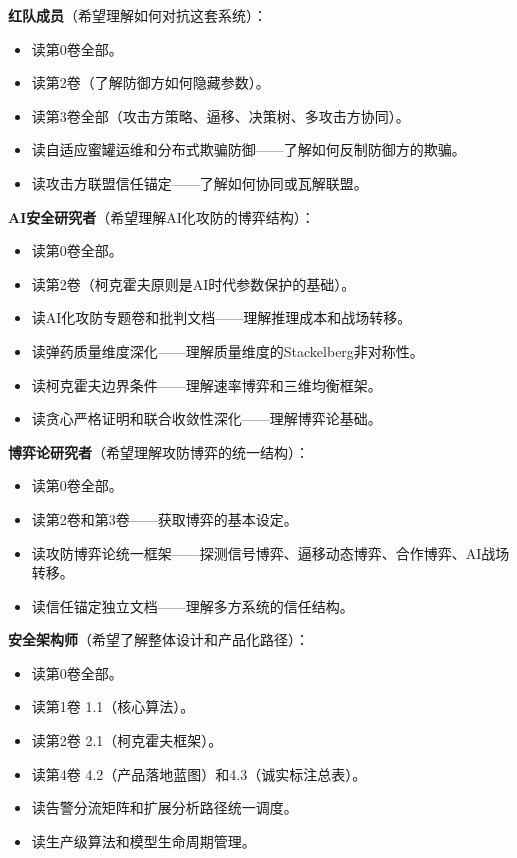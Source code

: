\documentclass[11pt,a4paper]{article}
\begin{document}
\textbf{红队成员}（希望理解如何对抗这套系统）：
\begin{itemize}
    \item 读第0卷全部。
    \item 读第2卷（了解防御方如何隐藏参数）。
    \item 读第3卷全部（攻击方策略、逼移、决策树、多攻击方协同）。
    \item 读自适应蜜罐运维和分布式欺骗防御——了解如何反制防御方的欺骗。
    \item 读攻击方联盟信任锚定——了解如何协同或瓦解联盟。
\end{itemize}

\textbf{AI安全研究者}（希望理解AI化攻防的博弈结构）：
\begin{itemize}
    \item 读第0卷全部。
    \item 读第2卷（柯克霍夫原则是AI时代参数保护的基础）。
    \item 读AI化攻防专题卷和批判文档——理解推理成本和战场转移。
    \item 读弹药质量维度深化——理解质量维度的Stackelberg非对称性。
    \item 读柯克霍夫边界条件——理解速率博弈和三维均衡框架。
    \item 读贪心严格证明和联合收敛性深化——理解博弈论基础。
\end{itemize}

\textbf{博弈论研究者}（希望理解攻防博弈的统一结构）：
\begin{itemize}
    \item 读第0卷全部。
    \item 读第2卷和第3卷——获取博弈的基本设定。
    \item 读攻防博弈论统一框架——探测信号博弈、逼移动态博弈、合作博弈、AI战场转移。
    \item 读信任锚定独立文档——理解多方系统的信任结构。
\end{itemize}

\textbf{安全架构师}（希望了解整体设计和产品化路径）：
\begin{itemize}
    \item 读第0卷全部。
    \item 读第1卷 1.1（核心算法）。
    \item 读第2卷 2.1（柯克霍夫框架）。
    \item 读第4卷 4.2（产品落地蓝图）和4.3（诚实标注总表）。
    \item 读告警分流矩阵和扩展分析路径统一调度。
    \item 读生产级算法和模型生命周期管理。
\end{itemize}
\end{document}
